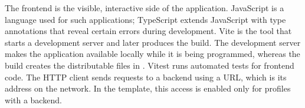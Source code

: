 \begin{beginnerstatement}

The frontend is the visible, interactive side of the application. JavaScript is
a language used for such applications; TypeScript extends JavaScript with type
annotations that reveal certain errors during development. Vite is the tool
that starts a development server and later produces the build. The development
server makes the application available locally while it is being programmed,
whereas the build creates the distributable files in
. Vitest runs automated tests for frontend code. The HTTP
client sends requests to a backend using a URL, which is its address on the
network. In the template, this access is enabled only for profiles with a
backend.

\end{beginnerstatement}
